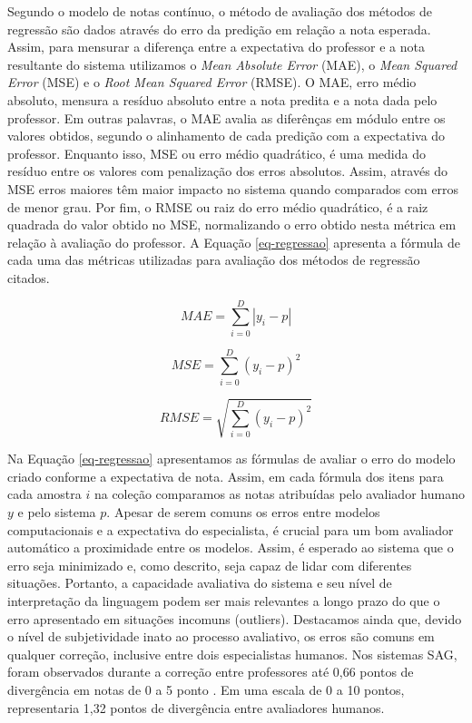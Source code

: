 Segundo o modelo de notas contínuo, o método de avaliação dos métodos de regressão são dados através do erro da predição em relação a nota esperada. Assim, para mensurar a diferença entre a expectativa do professor e a nota resultante do sistema utilizamos o \textit{Mean Absolute Error} (MAE), o \textit{Mean Squared Error} (MSE) e o \textit{Root Mean Squared Error} (RMSE). O MAE, erro médio absoluto, mensura a resíduo absoluto entre a nota predita e a nota dada pelo professor. Em outras palavras, o MAE avalia as diferênças em módulo entre os valores obtidos, segundo o alinhamento de cada predição com a expectativa do professor. Enquanto isso, MSE ou erro médio quadrático, é uma medida do resíduo entre os valores com penalização dos erros absolutos. Assim, através do MSE erros maiores têm maior impacto no sistema quando comparados com erros de menor grau. Por fim, o RMSE ou raiz do erro médio quadrático, é a raiz quadrada do valor obtido no MSE, normalizando o erro obtido nesta métrica em relação à avaliação do professor. A Equação \ref{eq-regressao} apresenta a fórmula de cada uma das métricas utilizadas para avaliação dos métodos de regressão citados.

\begin{equation}
MAE = \sum_{i=0}^{D}|y_i-p|
\label{eq-regressao}
\end{equation}

\begin{equation*}
MSE = \sum_{i=0}^{D}(y_i-p)^2
\end{equation*}

\begin{equation*}
RMSE = \sqrt{\sum_{i=0}^{D}(y_i-p)^2}
\end{equation*}

Na Equação \ref{eq-regressao} apresentamos as fórmulas de avaliar o erro do modelo criado conforme a expectativa de nota. Assim, em cada fórmula dos itens para cada amostra $ i $ na coleção comparamos as notas atribuídas pelo avaliador humano $ y $ e pelo sistema $ p $. Apesar de serem comuns os erros entre modelos computacionais e a expectativa do especialista, é crucial para um bom avaliador automático a proximidade entre os modelos. Assim, é esperado ao sistema que o erro seja minimizado e, como descrito, seja capaz de lidar com diferentes situações. Portanto, a capacidade avaliativa do sistema e seu nível de interpretação da linguagem podem ser mais relevantes a longo prazo do que o erro apresentado em situações incomuns (outliers). Destacamos ainda que, devido o nível de subjetividade inato ao processo avaliativo, os erros são comuns em qualquer correção, inclusive entre dois especialistas humanos. Nos sistemas SAG, foram observados durante a correção entre professores até 0,66 pontos de divergência em notas de 0 a 5 ponto \cite{mohler2011}. Em uma escala de 0 a 10 pontos, representaria 1,32 pontos de divergência entre avaliadores humanos.

